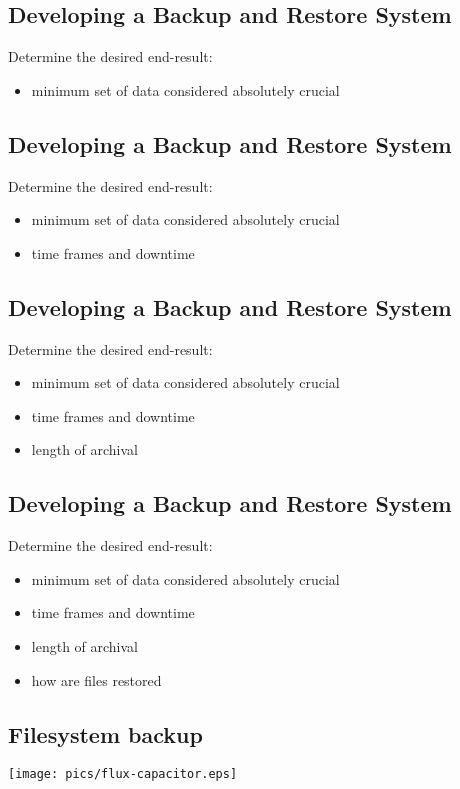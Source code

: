 \documentclass[xga]{xdvislides}
\begin{document}
\subsection{Developing a Backup and Restore System}
Determine the desired end-result:
\begin{itemize}
	\item minimum set of data considered absolutely crucial
\end{itemize}

\subsection{Developing a Backup and Restore System}
Determine the desired end-result:
\begin{itemize}
	\item minimum set of data considered absolutely crucial
	\item time frames and downtime
\end{itemize}

\subsection{Developing a Backup and Restore System}
Determine the desired end-result:
\begin{itemize}
	\item minimum set of data considered absolutely crucial
	\item time frames and downtime
	\item length of archival
\end{itemize}

\subsection{Developing a Backup and Restore System}
Determine the desired end-result:
\begin{itemize}
	\item minimum set of data considered absolutely crucial
	\item time frames and downtime
	\item length of archival
	\item how are files restored
\end{itemize}

\subsection{Filesystem backup}
\vspace*{\fill}
\begin{center}
	\texttt{[image: pics/flux-capacitor.eps]}
\end{center}
\vspace*{\fill}
\end{document}
